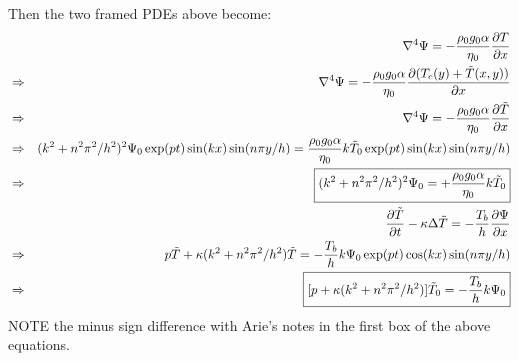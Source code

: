 Then the two framed PDEs above become:
\begin{eqnarray}
&& \nabla^4 \Psi= -\frac{\rho_0 g_0 \alpha}{\eta_0} \frac{\partial T}{\partial x} \nonumber \\
&\Rightarrow& \nabla^4 \Psi= -\frac{\rho_0 g_0 \alpha}{\eta_0} 
\frac{\partial (T_c(y)+\tilde{T}(x,y))}{\partial x} \nonumber \\
&\Rightarrow& \nabla^4 \Psi= -\frac{\rho_0 g_0 \alpha}{\eta_0} \frac{\partial \tilde{T}}{\partial x} \nonumber \\
&\Rightarrow& 
(k^2 + n^2 \pi^2/h^2)^2 \Psi_0 \exp(pt)  \sin(k x) \sin(n\pi y/h) = \frac{\rho_0 g_0 \alpha}{\eta_0} 
 k \tilde{T}_0 \exp(pt)  \sin(k x) \sin(n\pi y/h) \nonumber \\ 
&\Rightarrow&
\boxed{ (k^2 + n^2 \pi^2/h^2)^2 \Psi_0     = +\frac{\rho_0 g_0 \alpha}{\eta_0}  k \tilde{T}_0 } 
\nonumber\\ 
&& \frac{\partial \tilde{T}}{\partial t} - \kappa \Delta \tilde{T} 
= -  \frac{T_b}{h}   \frac{\partial \Psi}{\partial x} \nonumber\\
&\Rightarrow & p \tilde{T} + \kappa (k^2 + n^2\pi^2/h^2) \tilde{T}   
= -  \frac{T_b}{h} k \Psi_0 \exp(pt)  \cos(k x) \sin(n\pi y/h)\nonumber \\
&\Rightarrow & 
\boxed{ [ p + \kappa (k^2 + n^2\pi^2/h^2) ] \tilde{T}_0  = -  \frac{T_b}{h} k \Psi_0 } \nonumber
\end{eqnarray}
NOTE the minus sign difference with Arie's notes in the first box of the above equations.

